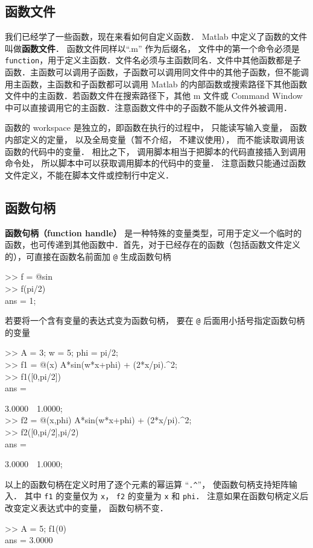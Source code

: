 

\subsection{函数文件}

我们已经学了一些函数，现在来看如何自定义函数． Matlab 中定义了函数的文件叫做\textbf{函数文件}． 函数文件同样以“.m” 作为后缀名， 文件中的第一个命令必须是 \texttt{function}，用于定义主函数．文件名必须与主函数同名．文件中其他函数都是子函数．主函数可以调用子函数，子函数可以调用同文件中的其他子函数，但不能调用主函数，主函数和子函数都可以调用 Matlab 的内部函数或搜索路径下其他函数文件中的主函数．若函数文件在搜索路径下，其他 m 文件或 Command Window 中可以直接调用它的主函数．注意函数文件中的子函数不能从文件外被调用．

函数的 workspace 是独立的，即函数在执行的过程中， 只能读写输入变量， 函数内部定义的定量， 以及全局变量（暂不介绍， 不建议使用）， 而不能读取调用该函数的代码中的变量． 相比之下， 调用脚本相当于把脚本的代码直接插入到调用命令处， 所以脚本中可以获取调用脚本的代码中的变量． 注意函数只能通过函数文件定义，不能在脚本文件或控制行中定义．

\subsection{函数句柄}
\textbf{函数句柄（function handle）} 是一种特殊的变量类型，可用于定义一个临时的函数，也可传递到其他函数中．首先，对于已经存在的函数（包括函数文件定义的），可直接在函数名前面加 \texttt{@} 生成函数句柄
\begin{Command}
>> f = @sin \\
>> f(pi/2) \\
ans = 1;
\end{Command}
若要将一个含有变量的表达式变为函数句柄， 要在 \texttt{@} 后面用小括号指定函数句柄的变量
\begin{Command}
>> A = 3; w = 5; phi = pi/2; \\
>> f1 = @(x) A*sin(w*x+phi) + (2*x/pi).\^{}2; \\
>> f1([0,pi/2]) \\
ans = \par
3.0000\ \ 1.0000; \\
>> f2 = @(x,phi) A*sin(w*x+phi) + (2*x/pi).\^{}2; \\
>> f2([0,pi/2],pi/2) \\
ans = \par
3.0000\ \ 1.0000;
\end{Command}
以上的函数句柄在定义时用了逐个元素的幂运算 “\texttt{.\^{}}”， 使函数句柄支持矩阵输入． 其中 \texttt{f1} 的变量仅为 \texttt{x}， \texttt{f2} 的变量为 \texttt{x} 和 \texttt{phi}． 注意如果在函数句柄定义后改变定义表达式中的变量， 函数句柄不变．
\begin{Command}
>> A = 5; f1(0)\\
ans = 3.0000
\end{Command}


